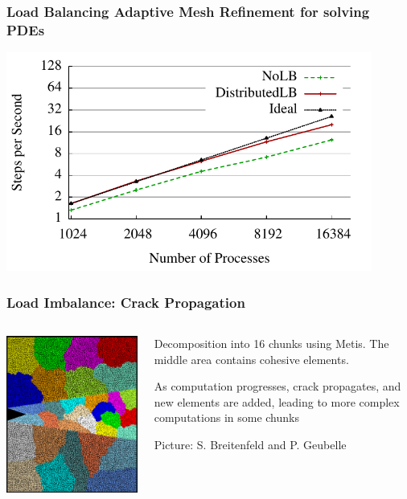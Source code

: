 \begin{frame}
\frametitle{Load Balancing Adaptive Mesh Refinement for solving PDEs}
\includegraphics[width=0.9\textwidth]{../figures/amr_scaling_distlb.pdf}
\end{frame}


\begin{frame}[fragile]
\frametitle{Load Imbalance: Crack Propagation}
\begin{columns}
\begin{column}{0.5\textwidth}
\includegraphics[width=\textwidth]{../figures/chunkGraph16}
\end{column}
\begin{column}{0.5\textwidth}
Decomposition into 16 chunks using Metis. The middle area contains cohesive elements.

As computation progresses, crack propagates, and new elements are added, leading to more complex computations in some chunks

Picture: S. Breitenfeld and P. Geubelle
\end{column}
\end{columns}
\end{frame}


